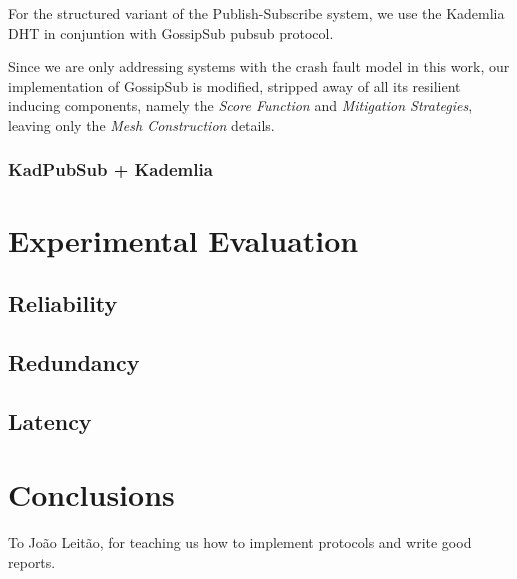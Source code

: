 \documentclass[sigconf]{acmart}
\begin{document}
For the structured variant of the Publish-Subscribe system, we use the Kademlia DHT in conjuntion with GossipSub pubsub protocol. 

Since we are only addressing systems with the crash fault model in this work, our implementation of GossipSub is modified, stripped away of all its resilient inducing components, namely the \textit{Score Function} and \textit{Mitigation Strategies}, leaving only the \textit{Mesh Construction} details.



% 



% 

\subsubsection{KadPubSub + Kademlia} %

\section{Experimental Evaluation}




\subsection{Reliability}



\subsection{Redundancy}

\subsection{Latency}

\section{Conclusions}

\begin{acks}
To João Leitão, for teaching us how to implement protocols and write good reports.
\end{acks}



\end{document}
